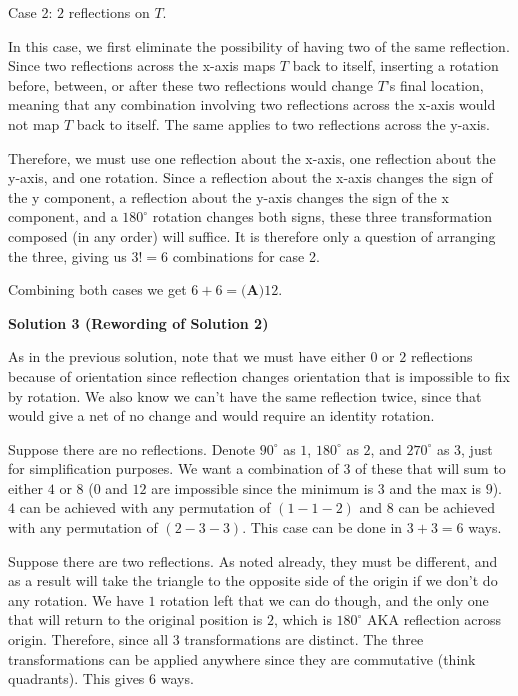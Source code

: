 \begin{enumerate}
 


 Case 2: $2$ reflections on $T$.

 


 In this case, we first eliminate the possibility of having two of the same reflection. Since two reflections across the x-axis maps $T$ back to itself, inserting a rotation before, between, or after these two reflections would change $T$'s final location, meaning that any combination involving two reflections across the x-axis would not map $T$ back to itself. The same applies to two reflections across the y-axis.

 Therefore, we must use one reflection about the x-axis, one reflection about the y-axis, and one rotation. Since a reflection about the x-axis changes the sign of the y component, a reflection about the y-axis changes the sign of the x component, and a $180^\circ$ rotation changes both signs, these three transformation composed (in any order) will suffice. It is therefore only a question of arranging the three, giving us $3! = 6$ combinations for case 2.

 Combining both cases we get $6+6=\boxed{\textbf{(A)}  12}$.

 



\textbf{Solution 3 (Rewording of Solution 2)}

As in the previous solution, note that we must have either $0$ or $2$ reflections because of orientation since reflection changes orientation that is impossible to fix by rotation. We also know we can't have the same reflection twice, since that would give a net of no change and would require an identity rotation.

 Suppose there are no reflections. Denote $90^{\circ}$ as $1$, $180^{\circ}$ as $2$, and $270^{\circ}$ as $3$, just for simplification purposes. We want a combination of $3$ of these that will sum to either $4$ or $8$ ($0$ and $12$ are impossible since the minimum is $3$ and the max is $9$). $4$ can be achieved with any permutation of $(1-1-2)$ and $8$ can be achieved with any permutation of $(2-3-3)$. This case can be done in $3+3=6$ ways.

 Suppose there are two reflections. As noted already, they must be different, and as a result will take the triangle to the opposite side of the origin if we don't do any rotation. We have $1$ rotation left that we can do though, and the only one that will return to the original position is $2$, which is $180^{\circ}$ AKA reflection across origin. Therefore, since all $3$ transformations are distinct. The three transformations can be applied anywhere since they are commutative (think quadrants). This gives $6$ ways.


\end{enumerate}
